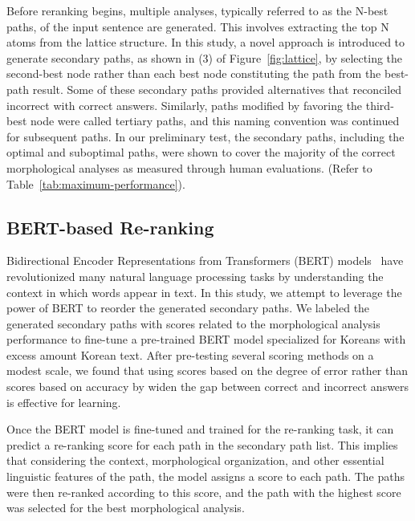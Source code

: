 \documentclass[AMS,STIX2COL]{WileyNJD-v2}
\begin{document}
    Before reranking begins, multiple analyses, typically referred to as the N-best paths, of the input sentence are generated. This involves extracting the top N atoms from the lattice structure. In this study, a novel approach is introduced to generate secondary paths, as shown in (3) of Figure~\ref{fig:lattice}, by selecting the second-best node rather than each best node constituting the path from the best-path result. Some of these secondary paths provided alternatives that reconciled incorrect with correct answers. Similarly, paths modified by favoring the third-best node were called tertiary paths, and this naming convention was continued for subsequent paths. In our preliminary test, the secondary paths, including the optimal and suboptimal paths, were shown to cover the majority of the correct morphological analyses as measured through human evaluations. (Refer to Table~\ref{tab:maximum-performance}).

    \subsection{BERT-based Re-ranking}\label{subsec4.3}

    Bidirectional Encoder Representations from Transformers (BERT) models~\cite{Devlin2019} have revolutionized many natural language processing tasks by understanding the context in which words appear in text. In this study, we attempt to leverage the power of BERT to reorder the generated secondary paths. We labeled the generated secondary paths with scores related to the morphological analysis performance to fine-tune a pre-trained BERT model specialized for Koreans with excess amount Korean text. After pre-testing several scoring methods on a modest scale, we found that using scores based on the degree of error rather than scores based on accuracy by widen the gap between correct and incorrect answers is effective for learning.

    Once the BERT model is fine-tuned and trained for the re-ranking task, it can predict a re-ranking score for each path in the secondary path list. This implies that considering the context, morphological organization, and other essential linguistic features of the path, the model assigns a score to each path. The paths were then re-ranked according to this score, and the path with the highest score was selected for the best morphological analysis.
\end{document}
